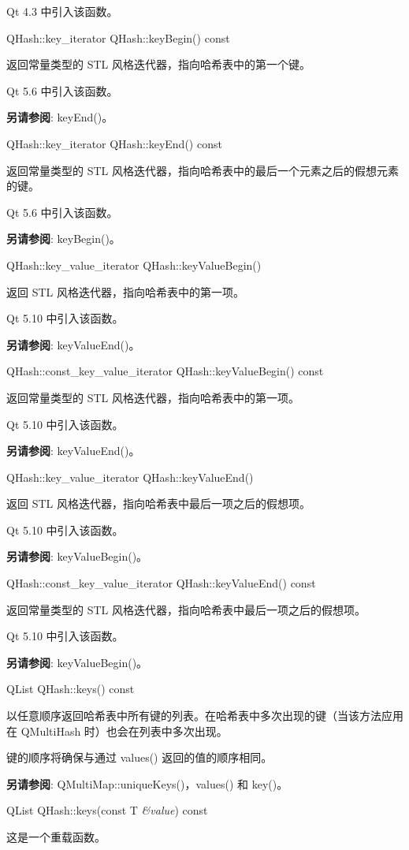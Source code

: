 Qt 4.3 中引入该函数。

QHash::key\_iterator QHash::keyBegin() const

返回常量类型的 STL 风格迭代器，指向哈希表中的第一个键。

Qt 5.6 中引入该函数。

\textbf{另请参阅}: keyEnd()。

QHash::key\_iterator QHash::keyEnd() const

返回常量类型的 STL 风格迭代器，指向哈希表中的最后一个元素之后的假想元素的键。

Qt 5.6 中引入该函数。

\textbf{另请参阅}: keyBegin()。

QHash::key\_value\_iterator QHash::keyValueBegin()

返回 STL 风格迭代器，指向哈希表中的第一项。

Qt 5.10 中引入该函数。

\textbf{另请参阅}: keyValueEnd()。

QHash::const\_key\_value\_iterator QHash::keyValueBegin() const

返回常量类型的 STL 风格迭代器，指向哈希表中的第一项。

Qt 5.10 中引入该函数。

\textbf{另请参阅}: keyValueEnd()。

QHash::key\_value\_iterator QHash::keyValueEnd()

返回 STL 风格迭代器，指向哈希表中最后一项之后的假想项。

Qt 5.10 中引入该函数。

\textbf{另请参阅}: keyValueBegin()。

QHash::const\_key\_value\_iterator QHash::keyValueEnd() const

返回常量类型的 STL 风格迭代器，指向哈希表中最后一项之后的假想项。

Qt 5.10 中引入该函数。

\textbf{另请参阅}: keyValueBegin()。

QList QHash::keys() const

以任意顺序返回哈希表中所有键的列表。在哈希表中多次出现的键（当该方法应用在 QMultiHash 时）也会在列表中多次出现。

键的顺序将确保与通过 values() 返回的值的顺序相同。

\textbf{另请参阅}: QMultiMap::uniqueKeys()，values() 和 key()。

QList QHash::keys(const T \emph{\&value}) const

这是一个重载函数。

